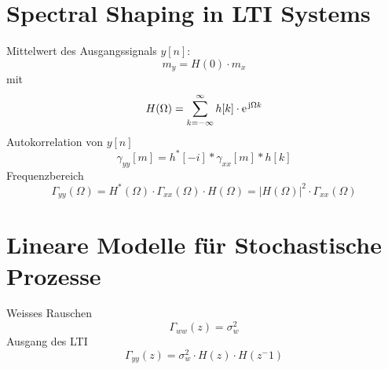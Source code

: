 \section{Spectral Shaping in LTI Systems}
Mittelwert des Ausgangssignals $y[n]$:
\[ m_y = H(0) \cdot m_x \]
mit
\[ H(\Omega) = \sum_{k=-\infty}^{\infty}h[k]\cdot\e^{\im\Omega k} \]
Autokorrelation von $y[n]$
\[ \gamma_{yy}[m] = h^*[-i]*\gamma_{xx}[m]*h[k] \]
Frequenzbereich
\[ \Gamma_{yy}(\Omega) = H^*(\Omega)\cdot\Gamma_{xx}(\Omega)\cdot H(\Omega) 
	= |H(\Omega)|^2 \cdot \Gamma_{xx}(\Omega) \]
	
\section{Lineare Modelle für Stochastische Prozesse}
Weisses Rauschen
\[ \Gamma_{ww}(z) = \sigma_w^2 \]
Ausgang des LTI
\[ \Gamma_{yy}(z) = \sigma_w^2 \cdot H(z) \cdot H(z^-1) \]
